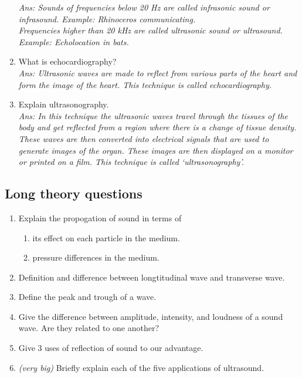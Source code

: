 \documentclass[12pt]{article}
\begin{document}
\begin{enumerate}
		\textit{Ans:  Sounds of frequencies below 20 Hz are called infrasonic sound or
			infrasound. Example: Rhinoceros communicating. \\
			Frequencies higher than 20 kHz are called ultrasonic sound or ultrasound.
			Example: Echolocation in bats.}
	\item What is echocardiography? \\
		\textit{Ans: Ultrasonic waves are made to reflect
			from various parts of the heart and
			form the image of the heart. This technique is called echocardiography.}
	\item Explain ultrasonography. \\
		\textit{Ans: In this technique the ultrasonic waves
			travel through the tissues of the body
			and get reflected from a region where
			there is a change of tissue density.
			These waves are then converted into
			electrical signals that are used to
			generate images of the organ. These
			images are then displayed on a monitor
			or printed on a film. This technique
			is called ‘ultrasonography’.}
\end{enumerate}

\subsection*{Long theory questions}
\begin{enumerate}
	\item Explain the propogation of sound in terms of
	\begin{enumerate}
		\item its effect on each particle in the medium.
		\item pressure differences in the medium.
	\end{enumerate}
	\item Definition and difference between longtitudinal wave and transverse wave.
	\item Define the peak and trough of a wave.
	\item Give the difference between amplitude, intensity, and loudness of a sound wave. Are they related to one another?
	\item Give 3 uses of reflection of sound to our advantage.
	\item \textit{(very big)} Briefly explain each of the five applications of ultrasound.
\end{enumerate}


\end{document}
